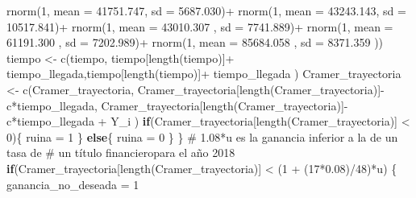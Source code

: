 \documentclass[
  us-letterpaper,
]{scrreprt}
\newenvironment{Shaded}{\begin{snugshade}}{\end{snugshade}}
\newcommand{\AttributeTok}[1]{\textcolor[rgb]{0.40,0.45,0.13}{#1}}
\newcommand{\CommentTok}[1]{\textcolor[rgb]{0.37,0.37,0.37}{#1}}
\newcommand{\ControlFlowTok}[1]{\textcolor[rgb]{0.00,0.23,0.31}{\textbf{#1}}}
\newcommand{\DecValTok}[1]{\textcolor[rgb]{0.68,0.00,0.00}{#1}}
\newcommand{\FloatTok}[1]{\textcolor[rgb]{0.68,0.00,0.00}{#1}}
\newcommand{\FunctionTok}[1]{\textcolor[rgb]{0.28,0.35,0.67}{#1}}
\newcommand{\NormalTok}[1]{\textcolor[rgb]{0.00,0.23,0.31}{#1}}
\newcommand{\OtherTok}[1]{\textcolor[rgb]{0.00,0.23,0.31}{#1}}
\newcommand{\SpecialCharTok}[1]{\textcolor[rgb]{0.37,0.37,0.37}{#1}}
\theoremstyle{plain}
\theoremstyle{plain}
\theoremstyle{definition}
\theoremstyle{remark}
\begin{document}
\begin{Shaded}
\begin{Highlighting}[]
              \FunctionTok{rnorm}\NormalTok{(}\DecValTok{1}\NormalTok{, }\AttributeTok{mean =}   \FloatTok{41751.747}\NormalTok{, }\AttributeTok{sd =} \FloatTok{5687.030}\NormalTok{)}\SpecialCharTok{+} 
              \FunctionTok{rnorm}\NormalTok{(}\DecValTok{1}\NormalTok{, }\AttributeTok{mean =}   \FloatTok{43243.143}\NormalTok{, }\AttributeTok{sd =} \FloatTok{10517.841}\NormalTok{)}\SpecialCharTok{+} 
              \FunctionTok{rnorm}\NormalTok{(}\DecValTok{1}\NormalTok{, }\AttributeTok{mean =} \FloatTok{43010.307}\NormalTok{  , }\AttributeTok{sd =} \FloatTok{7741.889}\NormalTok{)}\SpecialCharTok{+} 
              \FunctionTok{rnorm}\NormalTok{(}\DecValTok{1}\NormalTok{, }\AttributeTok{mean =} \FloatTok{61191.300}\NormalTok{  , }\AttributeTok{sd =} \FloatTok{7202.989}\NormalTok{)}\SpecialCharTok{+} 
              \FunctionTok{rnorm}\NormalTok{(}\DecValTok{1}\NormalTok{, }\AttributeTok{mean =}  \FloatTok{85684.058}\NormalTok{ , }\AttributeTok{sd =} \FloatTok{8371.359}\NormalTok{ )) }
\NormalTok{    tiempo }\OtherTok{\textless{}{-}} \FunctionTok{c}\NormalTok{(tiempo, tiempo[}\FunctionTok{length}\NormalTok{(tiempo)]}\SpecialCharTok{+} 
\NormalTok{                  tiempo\_llegada,tiempo[}\FunctionTok{length}\NormalTok{(tiempo)]}\SpecialCharTok{+} 
\NormalTok{                  tiempo\_llegada ) }
\NormalTok{    Cramer\_trayectoria }\OtherTok{\textless{}{-}} \FunctionTok{c}\NormalTok{(Cramer\_trayectoria,}
\NormalTok{                      Cramer\_trayectoria[}\FunctionTok{length}\NormalTok{(Cramer\_trayectoria)]}\SpecialCharTok{{-}}
\NormalTok{                      c}\SpecialCharTok{*}\NormalTok{tiempo\_llegada, }
\NormalTok{                      Cramer\_trayectoria[}\FunctionTok{length}\NormalTok{(Cramer\_trayectoria)]}\SpecialCharTok{{-}} 
\NormalTok{                      c}\SpecialCharTok{*}\NormalTok{tiempo\_llegada }\SpecialCharTok{+}\NormalTok{  Y\_i )}
    \ControlFlowTok{if}\NormalTok{(Cramer\_trayectoria[}\FunctionTok{length}\NormalTok{(Cramer\_trayectoria)] }\SpecialCharTok{\textless{}} \DecValTok{0}\NormalTok{)\{}
\NormalTok{      ruina }\OtherTok{=} \DecValTok{1}
\NormalTok{    \}}
    \ControlFlowTok{else}\NormalTok{\{}
\NormalTok{      ruina }\OtherTok{=} \DecValTok{0}
\NormalTok{    \}}
\NormalTok{  \}}
\CommentTok{\# 1.08*u es la ganancia inferior a la de un tasa de }
\CommentTok{\# un título financieropara el año 2018}
  \ControlFlowTok{if}\NormalTok{(Cramer\_trayectoria[}\FunctionTok{length}\NormalTok{(Cramer\_trayectoria)] }\SpecialCharTok{\textless{}}\NormalTok{ (}\DecValTok{1} \SpecialCharTok{+}\NormalTok{ (}\DecValTok{17}\SpecialCharTok{*}\FloatTok{0.08}\NormalTok{)}\SpecialCharTok{/}\DecValTok{48}\NormalTok{)}\SpecialCharTok{*}\NormalTok{u) \{}
\NormalTok{    ganancia\_no\_deseada }\OtherTok{=} \DecValTok{1}
    

\end{Highlighting}
\end{Shaded}
\end{document}
